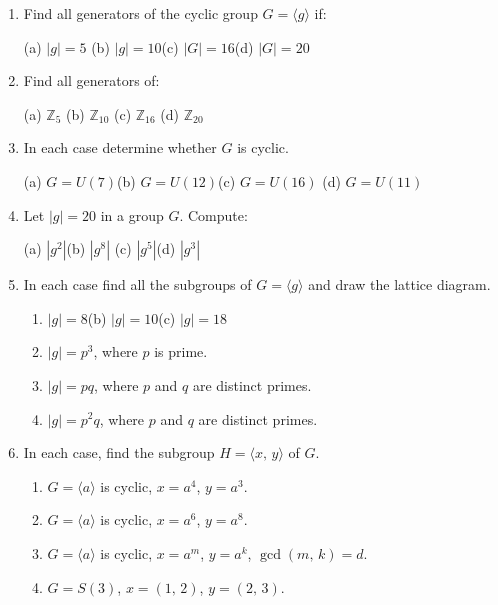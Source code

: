 \documentclass[12pt]{article}
\newcommand{\Z} {{\mathbb Z}}
\newcommand{\abs}[1]{\left\vert#1\right\vert}
\newcommand{\units}[1]{\ensuremath{U(#1)}}
\newcommand{\order}[1]{\ensuremath{|#1|}}
\newcommand{\<}{\ensuremath{\langle}}
\renewcommand{\>}{\ensuremath{\rangle}}
\theoremstyle{plain}
\theoremstyle{definition}
\begin{document}
\begin{enumerate}
\item Find all generators of the cyclic group $G=\langle g\rangle$
if:

(a) $\order{g}=5$ \qquad (b) $\order{g}=10$\qquad (c) $\abs{G}=16$\qquad (d)
$\abs{G}=20$
\item Find all generators of:

(a) $\Z_5$ \qquad (b) $\Z_{10}$ \qquad (c) $\Z_{16}$ \qquad (d)
$\Z_{20}$
\item In each case determine whether $G$ is cyclic.

(a) $G=\units{7}$\qquad (b) $G=\units{12}$\qquad (c) $G=\units{16}$
\qquad (d) $G=\units{11}$

\item Let $\order{g}=20$ in a group $G$. Compute:

(a) $\order{g^2}$\qquad (b) $\order{g^8}$ \qquad (c) $\order{g^5}$\qquad (d)
$\order{g^3}$

\item In each case find all the subgroups of $G=\langle g\rangle$
and draw the lattice diagram.
\begin{enumerate}
\item $\order{g}=8$\qquad \qquad (b) $\order{g}=10$\qquad \qquad(c) $\order{g}=18$
\addtocounter{enumii}{2}
\item $\order{g}=p^3$, where $p$ is prime.
\item $\order{g}=pq$,  where $p$ and $q$ are distinct primes.
\item $\order{g}=p^2q$, where $p$ and $q$ are distinct primes.
\end{enumerate}

\item In each case, find the subgroup $H=\langle x,\,y\rangle$ of
$G$.
\begin{enumerate}
\item $G=\langle a\rangle$ is cyclic, $x=a^4$, $y=a^3$.
\item $G=\langle a\rangle$ is cyclic, $x=a^6$, $y=a^8$.
\item $G=\langle a\rangle$ is cyclic, $x=a^m$, $y=a^k$,
$\gcd(m,\,k)=d$.
\item $G=S(3)$, $x=(1,\,2)$, $y=(2,\,3)$.
\end{enumerate}
\end{enumerate}
\end{document}
